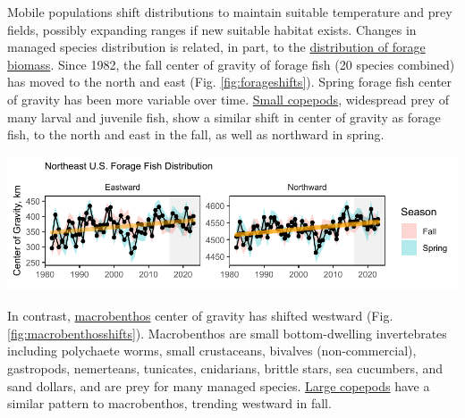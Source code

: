 \documentclass[
  10pt,
]{article}
\let\origfigure\figure
\let\endorigfigure\endfigure
\renewenvironment{figure}[1][2] {
    \expandafter\origfigure\expandafter[H]
} {
    \endorigfigure
}
\begin{document}
Mobile populations shift distributions to maintain suitable temperature and prey fields, possibly expanding ranges if new suitable habitat exists. Changes in managed species distribution is related, in part, to the \href{https://noaa-edab.github.io/catalog/forage_index.html}{distribution of forage biomass}. Since 1982, the fall center of gravity of forage fish (20 species combined) has moved to the north and east (Fig. \ref{fig:forageshifts}). Spring forage fish center of gravity has been more variable over time. \href{https://noaa-edab.github.io/catalog/zooplankton_index.html\#key-results-and-visualizations-4}{Small copepods}, widespread prey of many larval and juvenile fish, show a similar shift in center of gravity as forage fish, to the north and east in the fall, as well as northward in spring.

\begin{figure}

{\centering \includegraphics{midatlantic_files/figure-latex/forageshifts-1} 

}

\caption{Eastward (left) and northward (right) shifts in the center of gravity for 20 forage fish species on the Northeast U.S. Shelf, with increasing trend (orange) for fall eastward and northward center of gravity.}\label{fig:forageshifts}
\end{figure}

In contrast, \href{https://noaa-edab.github.io/catalog/benthos_index.html}{macrobenthos} center of gravity has shifted westward (Fig. \ref{fig:macrobenthosshifts}). Macrobenthos are small bottom-dwelling invertebrates including polychaete worms, small crustaceans, bivalves (non-commercial), gastropods, nemerteans, tunicates, cnidarians, brittle stars, sea cucumbers, and sand dollars, and are prey for many managed species. \href{https://noaa-edab.github.io/catalog/zooplankton_index.html\#key-results-and-visualizations-4}{Large copepods} have a similar pattern to macrobenthos, trending westward in fall.
\end{document}

